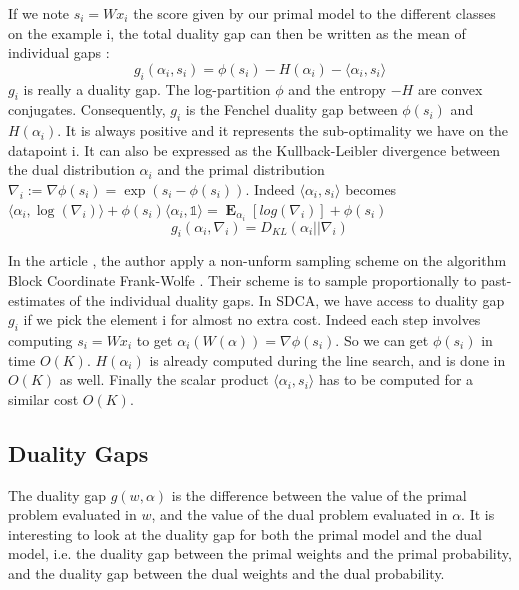 \documentclass{article}
\DeclareMathOperator{\1}{\mathbb{1}}
\DeclareMathOperator{\E}{\mathbf{E}}
\begin{document}
If we note $s_i=Wx_i$ the score given by our primal model to the different classes on the example i, the total duality gap can then be written as the mean of individual gaps : 
\begin{equation}
	g_i(\alpha_i,s_i) = \phi(s_i) - H(\alpha_i) - \langle\alpha_i, s_i\rangle
\end{equation}
$g_i$ is really a duality gap.
The log-partition $\phi$ and the entropy $-H$ are convex conjugates.
Consequently, $g_i$ is the Fenchel duality gap between $\phi(s_i)$ and $H(\alpha_i)$.
It is always positive and  it represents the sub-optimality we have on the datapoint i.
It can also be expressed as the Kullback-Leibler divergence between the dual distribution $\alpha_i$ and the primal distribution $\nabla_i := \nabla\phi(s_i) = \exp(s_i - \phi(s_i))$.
Indeed $\langle\alpha_i, s_i\rangle$ becomes $\langle\alpha_i, \log(\nabla_i)\rangle + \phi(s_i)\langle\alpha_i, \mathbb{1}\rangle = \E_{\alpha_i}[log(\nabla_i)] + \phi(s_i)$
\begin{equation}
	g_i(\alpha_i,\nabla_i) = D_{KL}(\alpha_i || \nabla_i)
\end{equation}

In the article \cite{osokin_minding_2016}, the author apply a non-unform sampling scheme on the algorithm Block Coordinate Frank-Wolfe \cite{lacoste-julien_block-coordinate_2012}. 
Their scheme is to sample proportionally to past-estimates of the individual duality gaps.
In SDCA, we have access to duality gap $g_i$ if we pick the element i for almost no extra cost.
Indeed each step involves computing $s_i = W x_i$ to get $\alpha_i(W(\alpha))=\nabla\phi(s_i)$.
So we can get $\phi(s_i)$ in time $O(K)$.
$H(\alpha_i)$ is already computed during the line search, and is done in $O(K)$ as well.
Finally the scalar product $\langle\alpha_i, s_i\rangle$ has to be computed for a similar cost $O(K)$.  

\subsection{Duality Gaps}

The duality gap $g(w,\alpha)$ is the difference between the value  of the primal problem evaluated in $w$, and the value of the dual problem evaluated in $\alpha$.
It is interesting to look at the duality gap for both the primal model and the dual model, i.e. the duality gap between the primal weights and the primal probability, and the duality gap between the dual weights and the dual probability.
\end{document}
